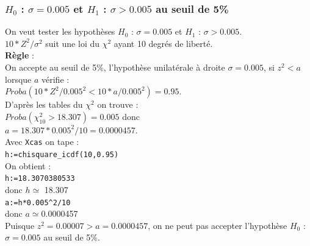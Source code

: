 \documentclass[a4paper,11pt]{book}
\begin{document}
\subsubsection{$H_0$ : $\sigma=0.005$ et $H_1$ : $\sigma>0.005$ au  seuil de 5\%}
On veut tester les hypoth\`eses $H_0$ : $\sigma=0.005$ 
 et $H_1$ : $\sigma>0.005$.\\
$10*Z^2/\sigma^2$ suit une loi du $\chi^2$ ayant 10 degr\'es de libert\'e.\\
{\bf R\`egle} :\\
On accepte  au  seuil de 5\%, l'hypoth\`ese unilat\'erale \`a 
droite  $\sigma=0.005$, si $z^2<a$ lorsque $a$ v\'erifie :\\
$Proba(10*Z^2/0.005^2<10*a/0.005^2)=0.95$.\\
D'apr\`es les tables du $\chi^2$ on trouve :\\
$Proba(\chi^2_{10}>18.307)=0.005$ donc\\
$a=18.307*0.005^2/10=0.0000457$.\\
Avec {\tt Xcas} on tape :\\
{\tt h:=chisquare\_icdf(10,0.95)}\\
On obtient :\\
{\tt h:=18.3070380533}\\
donc $h\simeq$ 18.307\\
{\tt a:=h*0.005\verb|^|2/10}\\
donc $a\simeq$0.0000457\\
Puisque $z^2=0.00007>a=0.0000457$, on ne peut pas accepter l'hypoth\`ese 
$H_0$ : $\sigma=0.005$ au seuil de 5\%.
\end{document}
